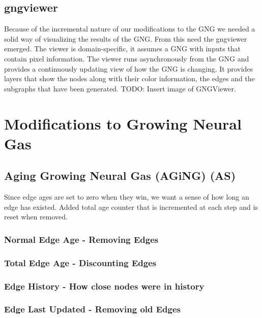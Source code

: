 \documentclass{article}
\renewcommand{\|}{\origbar} %
\begin{document}

\subsection{gngviewer}

Because of the incremental nature of our modifications to the GNG we needed a solid way of visualizing the results of the GNG. From this need the gngviewer emerged. The viewer is domain-specific, it assumes a GNG with inputs that contain pixel information. The viewer runs asynchronously from the GNG and provides a continuously updating view of how the GNG is changing. It provides layers that show the nodes along with their color information, the edges and the subgraphs that have been generated. TODO: Insert image of GNGViewer.


\section{Modifications to Growing Neural Gas}

\subsection{Aging Growing Neural Gas (AGiNG) (AS)}

Since edge ages are set to zero when they win, we want a sense of how long an edge has existed. Added total age counter that is incremented at each step and is reset when removed.

\subsubsection{Normal Edge Age - Removing Edges}
\subsubsection{Total Edge Age - Discounting Edges}
\subsubsection{Edge History - How close nodes were in history}
\subsubsection{Edge Last Updated - Removing old Edges}
\end{document}

